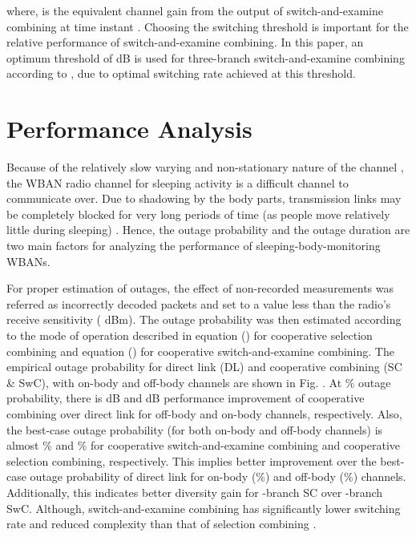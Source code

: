 \documentclass[twocolumn]{el-author}
\begin{document}
where,  is the equivalent channel gain from the output of switch-and-examine combining at time instant .
Choosing the switching threshold is important for the relative performance of switch-and-examine combining. In this paper, an optimum threshold of   dB is used for three-branch switch-and-examine combining according to \cite{7}, due to optimal switching rate achieved at this threshold.

\section{Performance Analysis}
Because of the relatively slow varying and non-stationary nature of the channel \cite{8}, the WBAN radio channel for sleeping activity is a difficult channel to communicate over. Due to shadowing by the body parts, transmission links may be completely blocked for very long periods of time (as people move relatively little during sleeping) \cite{9}. Hence, the outage probability and the outage duration are two main factors for analyzing the performance of sleeping-body-monitoring WBANs.

For proper estimation of outages, the effect of non-recorded measurements was referred as incorrectly decoded packets and set to a value less than the radio's receive sensitivity ( dBm). The outage probability was then estimated according to the mode of operation described in equation () for cooperative selection combining and equation () for cooperative switch-and-examine combining. The empirical outage probability for direct link (DL) and cooperative combining (SC \& SwC), with on-body and off-body channels are shown in Fig. . At \% outage probability, there is  dB and  dB performance improvement of cooperative combining over direct link for off-body and on-body channels, respectively. 
Also, the best-case outage probability (for both on-body and off-body channels) is almost \% and \% for cooperative switch-and-examine combining and cooperative selection combining, respectively. This implies better improvement over the best-case outage probability of direct link for on-body (\%) and off-body (\%) channels. Additionally, this indicates better diversity gain for -branch SC over -branch SwC. Although, switch-and-examine combining has significantly lower switching rate and reduced complexity than that of selection combining \cite{7}.
\end{document}

